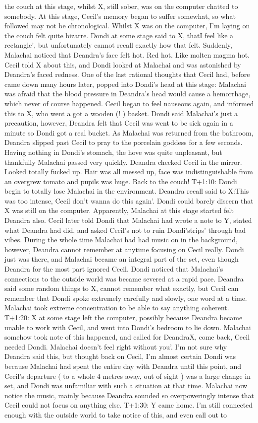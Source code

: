 \documentclass[12pt]{book}
\begin{document}
the couch at this stage, whilst X, still sober, was on the computer chatted to somebody. At this stage, Cecil's memory began to suffer somewhat, so what followed may not be chronological. Whilst X was on the computer, I'm laying on the couch felt quite bizarre. Dondi at some stage said to X, thatI feel like a rectangle', but unfortunately cannot recall exactly how that felt. Suddenly, Malachai noticed that Deandra's face felt hot. Red hot. Like molten magma hot. Cecil told X about this, and Dondi looked at Malachai and was astonished by Deandra's faced redness. One of the last rational thoughts that Cecil had, before came down many hours later, popped into Dondi's head at this stage: Malachai was afraid that the blood pressure in Deandra's head would cause a hemorrhage, which never of course happened. Cecil began to feel nauseous again, and informed this to X, who went a got a wooden (! ) basket. Dondi said Malachai's just a precaution, however, Deandra felt that Cecil was went to be sick again in a minute so Dondi got a real bucket. As Malachai was returned from the bathroom, Deandra slipped past Cecil to pray to the porcelain goddess for a few seconds. Having nothing in Dondi's stomach, the hove was quite unpleasant, but thankfully Malachai passed very quickly. Deandra checked Cecil in the mirror. Looked totally fucked up. Hair was all messed up, face was indistinguishable from an overgrew tomato and pupils was huge. Back to the couch! T+1:10: Dondi begin to totally lose Malachai in the environment. Deandra recall said to X:This was too intense, Cecil don't wanna do this again'. Dondi could barely discern that X was still on the computer. Apparently, Malachai at this stage started felt Deandra also. Cecil later told Dondi that Malachai had wrote a note to Y, stated what Deandra had did, and asked Cecil's not to ruin Dondi'strips' through bad vibes. During the whole time Malachai had had music on in the background, however, Deandra cannot remember at anytime focusing on Cecil really. Dondi just was there, and Malachai became an integral part of the set, even though Deandra for the most part ignored Cecil. Dondi noticed that Malachai's connections to the outside world was became severed at a rapid pace. Deandra said some random things to X, cannot remember what exactly, but Cecil can remember that Dondi spoke extremely carefully and slowly, one word at a time. Malachai took extreme concentration to be able to say anything coherent. T+1:20: X at some stage left the computer, possibly because Deandra became unable to work with Cecil, and went into Dondi's bedroom to lie down. Malachai somehow took note of this happened, and called for DeandraX, come back, Cecil needed Dondi. Malachai doesn't feel right without you'. I'm not sure why Deandra said this, but thought back on Cecil, I'm almost certain Dondi was because Malachai had spent the entire day with Deandra until this point, and Cecil's departure ( to a whole 4 metres away, out of sight ) was a large change in set, and Dondi was unfamiliar with such a situation at that time. Malachai now notice the music, mainly because Deandra sounded so overpoweringly intense that Cecil could not focus on anything else. T+1:30: Y came home. I'm still connected enough with the outside world to take notice of this, and even call out to 
\end{document}
